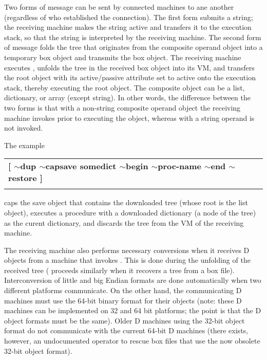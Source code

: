 Two forms of message can be sent by connected machines to ane another
(regardless of who established the connection). The first form submits
a string; the receiving machine makes the string active and transfers
it to the execution stack, so that the string is interpreted by the
receiving machine. The second form of message folds the tree that
originates from the composite operand object into a temporary box
object and transmits the box object. The receiving machine executes
, unfolds the tree in the received box object into its VM,
and transfers the root object with its active/passive attribute set to
active onto the execution stack, thereby executing the root
object. The composite object can be a list, dictionary, or array
(except string). In other words, the difference between the two forms
is that with a non-string composite operand object the receiving
machine invokes  prior to executing the object, whereas with
a string operand  is not invoked.

The example\\

\begin{tabular}{>{\sffamily\bfseries}l}
  [ $\sim$dup $\sim$capsave somedict $\sim$begin $\sim$proc-name $\sim$end $\sim$restore ]\\\\
\end{tabular}

\noindent caps the save object that contains the downloaded tree
(whose root is the list object), executes a procedure with a
downloaded dictionary (a node of the tree) as the curent dictionary,
and discards the tree from the VM of the receiving machine.

The receiving machine also performs necessary conversions when it
receives D objects from a machine that invokes . This is done
during the unfolding of the received tree ( proceeds
similarly when it recovers a tree from a box file). Interconversion of
little and big Endian formats are done automatically when two
different platforms communicate. On the other hand, the communicating
D machines must use the 64-bit binary format for their objects (note:
these D machines can be implemented on 32 and 64 bit platforms; the
point is that the D object formats must be the same). Older D machines
using the 32-bit object format do not communicate with the current
64-bit D machines (there exists, however, an undocumented operator to
rescue box files that use the now obsolete 32-bit object format).
  

